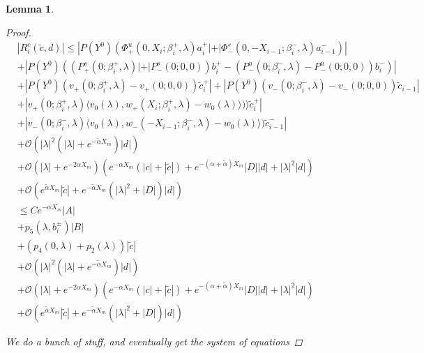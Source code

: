 \documentclass[12pt]{article}
\newtheorem{lemma}{Lemma}
\begin{document}
\begin{lemma}
\begin{proof}
\begin{align*}
&|R^c_i(\tilde{c},d)| \leq  
|P(Y^0)( \Phi^u_+(0, X_i; \beta_i^+, \lambda)a_i^+| + |\Phi^s_-(0, -X_{i-1}; \beta_i^-, \lambda)a_{i-1}^-)| \\
&+|P(Y^0)( (P^s_+(0; \beta_i^+, \lambda)| + |P^s_-(0; 0, 0))b_i^+ - (P^u_-(0; \beta_i^-, \lambda) - P^u_-(0; 0, 0))b_i^- )|\\
&+|P(Y^0)(v_+(0; \beta_i^+, \lambda) - v_+(0; 0, 0)) \tilde{c}_i^+| 
+ |P(Y^0)(v_-(0; \beta_i^-, \lambda) - v_-(0; 0, 0)) \tilde{c}_{i-1}| \\
&+ |v_+(0; \beta_i^+, \lambda) \langle v_0(\lambda), w_+(X_i; \beta_i^+, \lambda) - w_0(\lambda) \rangle ) \rangle \tilde{c}_i^+| \\
&+ |v_-(0; \beta_i^-, \lambda) \langle v_0(\lambda), w_-(-X_{i-1}; \beta_i^-, \lambda) - w_0(\lambda) \rangle ) \tilde{c}_{i-1}^-| \\
&+ \mathcal{O}(|\lambda|^2(|\lambda| + e^{-\tilde{\alpha} X_m})|d| ) \\
&+ \mathcal{O}(|\lambda| + e^{-2 \alpha X_m})( e^{-\alpha X_m}(|c| + |\tilde{c}|) +  e^{-(\alpha + \tilde{\alpha}) X_m } |D||d| + |\lambda|^2|d|) \\
&+ \mathcal{O}( e^{\tilde{\alpha} X_m}|\tilde{c}| + e^{-\tilde{\alpha} X_m} (|\lambda|^2 + |D|)|d| ) \\
&\leq  
C e^{-\alpha X_m} |A| \\
&+ p_5(\lambda, b_i^\pm) |B| \\
&+ (p_4(0, \lambda) + p_2(\lambda) ) |\tilde{c} | \\
&+ \mathcal{O}(|\lambda|^2(|\lambda| + e^{-\tilde{\alpha} X_m})|d| ) \\
&+ \mathcal{O}(|\lambda| + e^{-2 \alpha X_m})( e^{-\alpha X_m}(|c| + |\tilde{c}|) +  e^{-(\alpha + \tilde{\alpha}) X_m } |D||d| + |\lambda|^2|d|) \\
&+ \mathcal{O}( e^{\tilde{\alpha} X_m}|\tilde{c}| + e^{-\tilde{\alpha} X_m} (|\lambda|^2 + |D|)|d| )
\end{align*}

We do a bunch of stuff, and eventually get the system of equations


\end{proof}
\end{lemma}
\end{document}
